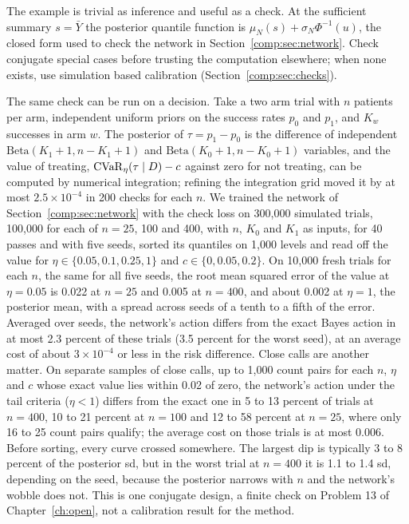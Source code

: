 The example is trivial as inference and useful as a check. At the sufficient summary $s=\bar Y$ the posterior quantile function is $\mu_N(s)+\sigma_N\Phi^{-1}(u)$, the closed form used to check the network in Section~\ref{comp:sec:network}. Check conjugate special cases before trusting the computation elsewhere; when none exists, use simulation based calibration (Section~\ref{comp:sec:checks}).

The same check can be run on a decision. Take a two arm trial with $n$ patients per arm, independent uniform priors on the success rates $p_0$ and $p_1$, and $K_w$ successes in arm $w$. The posterior of $\tau=p_1-p_0$ is the difference of independent $\mathrm{Beta}(K_1+1,n-K_1+1)$ and $\mathrm{Beta}(K_0+1,n-K_0+1)$ variables, and the value of treating, $\mathrm{CVaR}_\eta(\tau\mid D)-c$ against zero for not treating, can be computed by numerical integration; refining the integration grid moved it by at most $2.5\times10^{-4}$ in 200 checks for each $n$. We trained the network of Section~\ref{comp:sec:network} with the check loss on 300{,}000 simulated trials, 100{,}000 for each of $n=25$, 100 and 400, with $n$, $K_0$ and $K_1$ as inputs, for 40 passes and with five seeds, sorted its quantiles on 1{,}000 levels and read off the value for $\eta\in\{0.05,0.1,0.25,1\}$ and $c\in\{0,0.05,0.2\}$. On 10{,}000 fresh trials for each $n$, the same for all five seeds, the root mean squared error of the value at $\eta=0.05$ is 0.022 at $n=25$ and 0.005 at $n=400$, and about 0.002 at $\eta=1$, the posterior mean, with a spread across seeds of a tenth to a fifth of the error. Averaged over seeds, the network's action differs from the exact Bayes action in at most 2.3 percent of these trials (3.5 percent for the worst seed), at an average cost of about $3\times10^{-4}$ or less in the risk difference. Close calls are another matter. On separate samples of close calls, up to 1{,}000 count pairs for each $n$, $\eta$ and $c$ whose exact value lies within 0.02 of zero, the network's action under the tail criteria ($\eta<1$) differs from the exact one in 5 to 13 percent of trials at $n=400$, 10 to 21 percent at $n=100$ and 12 to 58 percent at $n=25$, where only 16 to 25 count pairs qualify; the average cost on those trials is at most 0.006. Before sorting, every curve crossed somewhere. The largest dip is typically 3 to 8 percent of the posterior sd, but in the worst trial at $n=400$ it is 1.1 to 1.4 sd, depending on the seed, because the posterior narrows with $n$ and the network's wobble does not. This is one conjugate design, a finite check on Problem 13 of Chapter~\ref{ch:open}, not a calibration result for the method.

